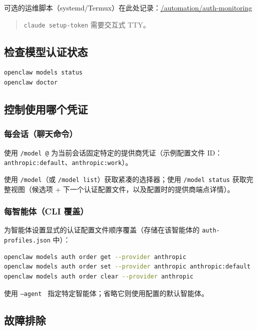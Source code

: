 可选的运维脚本（systemd/Termux）在此处记录：\href{/automation/auth-monitoring}{/automation/auth-monitoring}

\begin{quote}
\texttt{claude setup-token} 需要交互式 TTY。
\end{quote}


\subsection{检查模型认证状态}


\begin{lstlisting}[language=bash]
openclaw models status
openclaw doctor
\end{lstlisting}


\subsection{控制使用哪个凭证}


\subsubsection{每会话（聊天命令）}


使用 \texttt{/model @} 为当前会话固定特定的提供商凭证（示例配置文件 ID：\texttt{anthropic:default}、\texttt{anthropic:work}）。

使用 \texttt{/model}（或 \texttt{/model list}）获取紧凑的选择器；使用 \texttt{/model status} 获取完整视图（候选项 + 下一个认证配置文件，以及配置时的提供商端点详情）。

\subsubsection{每智能体（CLI 覆盖）}


为智能体设置显式的认证配置文件顺序覆盖（存储在该智能体的 \texttt{auth-profiles.json} 中）：

\begin{lstlisting}[language=bash]
openclaw models auth order get --provider anthropic
openclaw models auth order set --provider anthropic anthropic:default
openclaw models auth order clear --provider anthropic
\end{lstlisting}


使用 \texttt{--agent } 指定特定智能体；省略它则使用配置的默认智能体。

\subsection{故障排除}


